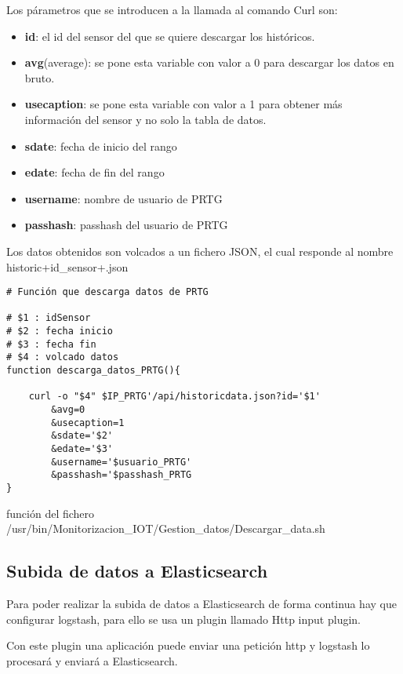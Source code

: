 Los párametros que se introducen a la llamada al comando Curl son:
\begin{itemize}
    \item \textbf{id}: el id del sensor del que se quiere descargar los históricos.
    \item \textbf{avg}(average): se pone esta variable con valor a 0 para descargar los datos en bruto.
    \item \textbf{usecaption}: se pone esta variable con valor a 1 para obtener más información del sensor y no solo la tabla de datos.
    \item \textbf{sdate}: fecha de inicio del rango
    \item \textbf{edate}: fecha de fin del rango
    \item \textbf{username}: nombre de usuario de PRTG
    \item \textbf{passhash}: passhash del usuario de PRTG
\end{itemize}


Los datos obtenidos son volcados a un fichero JSON, el cual responde al nombre historic+id\_sensor+.json


 \begin{verbatim}    
# Función que descarga datos de PRTG

# $1 : idSensor
# $2 : fecha inicio
# $3 : fecha fin
# $4 : volcado datos
function descarga_datos_PRTG(){

    curl -o "$4" $IP_PRTG'/api/historicdata.json?id='$1'
        &avg=0
        &usecaption=1
        &sdate='$2'
        &edate='$3'
        &username='$usuario_PRTG'
        &passhash='$passhash_PRTG
}
\end{verbatim}   
\caption{función del fichero 
/usr/bin/Monitorizacion\_IOT/Gestion\_datos/Descargar\_data.sh}    


\subsection{Subida de datos a Elasticsearch}
    
Para poder realizar la subida de datos a Elasticsearch de forma continua hay que configurar logstash, para ello se usa un plugin llamado Http input plugin. 

Con este plugin una aplicación puede enviar una petición http y logstash lo procesará y enviará a Elasticsearch.\cite{pagina:Http_plugin_input}

